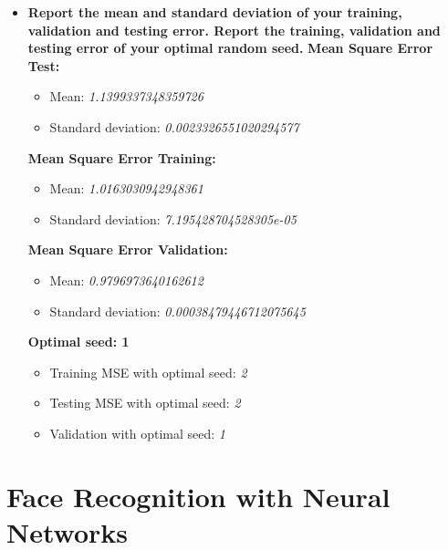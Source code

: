 \documentclass[a4paper]{article}
\begin{document}
\begin{enumerate}[label=(\alph*)]
\begin{itemize}
\item \textbf{Report the mean and standard deviation of your training, validation and testing error. Report the training, validation and testing error of your optimal random seed.}
\newline \newline
\textbf{Mean Square Error Test:}
\begin{itemize}
\item Mean: \textit{1.1399337348359726}
\item Standard deviation: \textit{0.0023326551020294577}
\end{itemize}
\hfill \newline
\textbf{Mean Square Error Training:}
\begin{itemize}
\item Mean: \textit{1.0163030942948361}
\item Standard deviation: \textit{7.195428704528305e-05}
\end{itemize}
\hfill \newline
\textbf{Mean Square Error Validation:}
\begin{itemize}
\item Mean:\textit{ 0.9796973640162612}
\item Standard deviation: \textit{0.00038479446712075645}
\end{itemize}
\hfill \newline
\textbf{Optimal seed: 1}
\begin{itemize}
\item Training MSE with optimal seed:\textit{ 2}
\item Testing MSE with optimal seed: \textit{2}
\item Validation with optimal seed: \textit{1}
\end{itemize}

\end{itemize}
\end{enumerate}

\newpage

\section{Face Recognition with Neural Networks}
\end{document}
